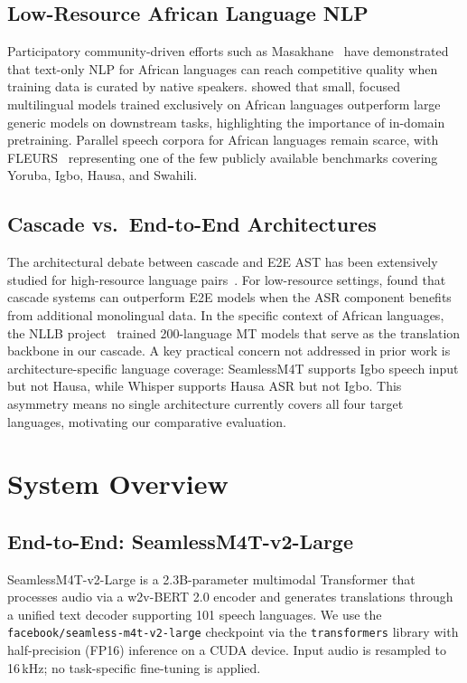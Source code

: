 \documentclass[11pt,a4paper]{article}
\begin{document}
\subsection{Low-Resource African Language NLP}
Participatory community-driven efforts such as Masakhane~\citep{nekoto2020participatory} have demonstrated that text-only NLP for African languages can reach competitive quality when training data is curated by native speakers. \citet{ogueji2021small} showed that small, focused multilingual models trained exclusively on African languages outperform large generic models on downstream tasks, highlighting the importance of in-domain pretraining. Parallel speech corpora for African languages remain scarce, with FLEURS~\citep{conneau2023fleurs} representing one of the few publicly available benchmarks covering Yoruba, Igbo, Hausa, and Swahili.

\subsection{Cascade vs.\ End-to-End Architectures}
The architectural debate between cascade and E2E AST has been extensively studied for high-resource language pairs~\citep{niehues2019iwslt}. For low-resource settings, \citet{inaguma2020espnet} found that cascade systems can outperform E2E models when the ASR component benefits from additional monolingual data. In the specific context of African languages, the NLLB project~\citep{costa-jussa-etal-2022-no} trained 200-language MT models that serve as the translation backbone in our cascade. A key practical concern not addressed in prior work is architecture-specific language coverage: SeamlessM4T supports Igbo speech input but not Hausa, while Whisper supports Hausa ASR but not Igbo. This asymmetry means no single architecture currently covers all four target languages, motivating our comparative evaluation.

\section{System Overview}
\label{sec:systems}

\subsection{End-to-End: SeamlessM4T-v2-Large}
SeamlessM4T-v2-Large is a 2.3B-parameter multimodal Transformer that processes audio via a w2v-BERT 2.0 encoder and generates translations through a unified text decoder supporting 101 speech languages. We use the \texttt{facebook/seamless-m4t-v2-large} checkpoint via the \texttt{transformers} library with half-precision (FP16) inference on a CUDA device. Input audio is resampled to 16\,kHz; no task-specific fine-tuning is applied.
\end{document}
